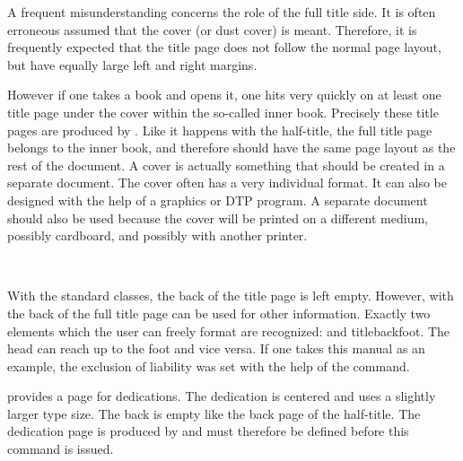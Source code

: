 \begin{Explain}
A frequent misunderstanding concerns the role of the full title side.
It is often erroneous assumed that the cover (or dust cover) is meant.
Therefore, it is frequently expected that the title page does not follow
the normal page layout, but have equally large left and right margins.

However if one takes a book and opens it, one hits very quickly on at
least one title page under the cover within the so-called inner book.
Precisely these title pages are produced by . Like it
happens with the half-title, the full title page belongs to the inner
book, and therefore should have the same page layout as the rest of
the document.  A cover is actually something that should be created in
a separate document. The cover often has a very individual format. It
can also be designed with the help of a graphics or DTP program. A
separate document should also be used because the cover will be
printed on a different medium, possibly cardboard, and possibly with
another printer.
\end{Explain}
%
%
%
%
%
%
%
%
%



\begin{Declaration}
  \\
\end{Declaration}%
%
%
%
With the standard classes, the back of the title page is left empty.
However, with {\KOMAScript} the back of the full title page can be
used for other information. Exactly two elements which the user can
freely format are recognized:  and \PName
{titlebackfoot}. The head can reach up to the foot and vice versa. If
one takes this manual as an example, the exclusion of liability was
set with the help of the  command.
%
%


\begin{Declaration}
\end{Declaration}%
%
{\KOMAScript} provides a page for dedications. The
dedication is centered and uses a slightly larger
type size.  The back is empty like the back page of the half-title.
The dedication page is produced by  and must
therefore be defined before this command is issued.

